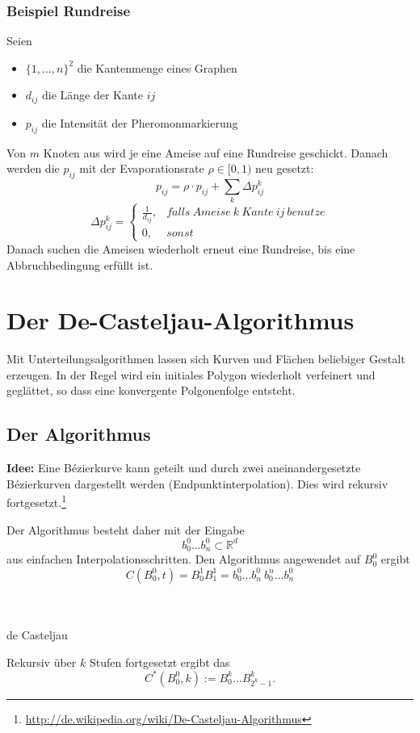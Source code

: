 \subsubsection{Beispiel Rundreise}
Seien
\begin{itemize}
	\item \(\{1,...,n\}^2\) die Kantenmenge eines Graphen
	\item \(d_{ij}\) die Länge der Kante \(ij\)
	\item \(p_{ij}\) die Intensität der Pheromonmarkierung
\end{itemize}
Von \(m\) Knoten aus wird je eine Ameise auf eine Rundreise geschickt. Danach werden die \(p_{ij}\) mit der Evaporationsrate \(\rho \in \lbrack 0,1)\) neu gesetzt:
\[p_{ij} = \rho \cdot p_{ij} + \sum_k \Delta p_{ij}^k\]
\[\Delta p_{ij}^k = \begin{cases} \frac{1}{d_{ij}}, & falls~Ameise~k~Kante~ij~benutze \\ 0, & sonst \end{cases}\]
Danach suchen die Ameisen wiederholt erneut eine Rundreise, bis eine Abbruchbedingung erfüllt ist.



\section{Der De-Casteljau-Algorithmus}
Mit Unterteilungsalgorithmen lassen sich Kurven und Flächen beliebiger Gestalt erzeugen. In der Regel wird ein initiales Polygon wiederholt verfeinert und geglättet, so dass eine konvergente Polgonenfolge entsteht.

\subsection{Der Algorithmus}
\textbf{Idee:} Eine Bézierkurve kann geteilt und durch zwei aneinandergesetzte Bézierkurven dargestellt werden (Endpunktinterpolation). Dies wird rekursiv fortgesetzt.\footnote{\url{http://de.wikipedia.org/wiki/De-Casteljau-Algorithmus}}

Der Algorithmus besteht daher mit der Eingabe
\[b_0^0...b_n^0 \subset \mathbb{R}^d\]
aus einfachen Interpolationsschritten. Den Algorithmus angewendet auf \(B_0^0\) ergibt
\[C(B_0^0,t) = B_0^1B_1^1 = b_0^0...b_n^0~b_0^n...b_n^0\]
\\\\
\begin{algorithm}[H]
	\caption{de Casteljau}

	\BlankLine

\end{algorithm}
Rekursiv über \(k\) Stufen fortgesetzt ergibt das
\[C^*(B_0^0,k):=B_0^k...B_{2^k-1}^k.\]


